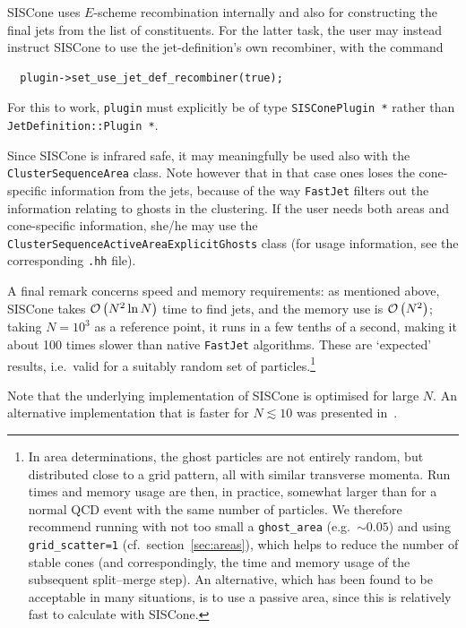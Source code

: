 \documentclass[12pt,a4]{article}
\newcommand{\fastjet}{\texttt{FastJet}\xspace}
\newcommand{\ttt}[1]{{\small\texttt{#1}}}
\newcommand{\order}[1]{{\cal O}\left(#1\right)}
\begin{document}
SISCone uses $E$-scheme recombination internally and also for
constructing the final jets from the list of constituents. 
%
For the latter task, the user may instead instruct SISCone to use the
jet-definition's own recombiner, with the command
\begin{lstlisting}
  plugin->set_use_jet_def_recombiner(true);
\end{lstlisting}
For this to work, \ttt{plugin} must explicitly be of type
\ttt{SISConePlugin *} rather than \ttt{JetDefinition::Plugin *}. 

Since SISCone is infrared safe, it may meaningfully be used also with
the \verb:ClusterSequenceArea: class. Note however that in that
case ones loses the cone-specific information from the jets, because
of the way \fastjet filters out the information relating to ghosts in
the clustering. If the user needs both areas and cone-specific
information, she/he may use the
\verb:ClusterSequenceActiveAreaExplicitGhosts: class (for usage
information, see the corresponding \verb:.hh: file). 

A final remark concerns speed and memory requirements: as mentioned
above, SISCone takes $\order{N^2 \ln N}$ time to find jets, and the
memory use is $\order{N^2}$; taking $N=10^3$ as a reference point, it
runs in a few tenths of a second, making it about 100 times slower
than native \fastjet algorithms.
%
These are `expected' results, i.e.\ valid for a suitably random set of
particles.\footnote{%
  In area determinations, the ghost particles are not entirely random,
  but distributed close to a grid pattern, all with similar transverse
  momenta.
  Run times and memory usage are then, in practice, somewhat larger
  than for a normal QCD event with the same number of particles.  
  We therefore recommend running with not too small a
  \texttt{ghost\_area} (e.g.\ $\sim 0.05$) and using
  \texttt{grid\_scatter=1} (cf.\ section~\ref{sec:areas}), which helps
  to reduce the number of stable cones (and correspondingly, the time
  and memory usage of the subsequent split--merge step). 
  An alternative, which has been found to be acceptable in many
  situations, is to use a passive area, since this is relatively fast
  to calculate with SISCone.
}


Note that the underlying implementation of SISCone is optimised for
large $N$.
%
An alternative implementation that is faster for $N \lesssim 10$ was
presented in~\cite{Weinzierl:2011jx}. 

\end{document}

